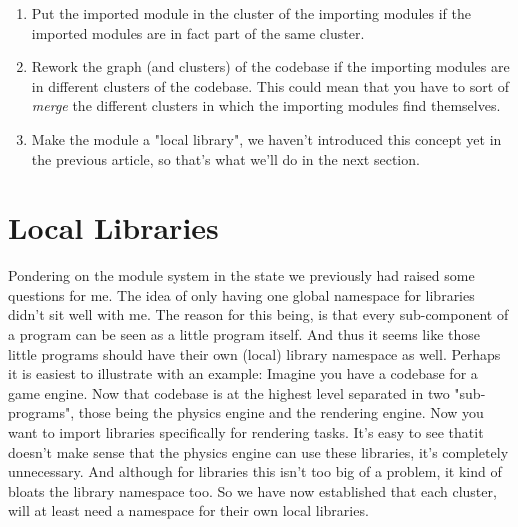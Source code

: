 \documentclass{article}
\begin{document}
 \begin{enumerate}
        \item Put the imported module in the cluster of the importing modules if the imported modules are in fact part of the same cluster.
        

        \item Rework the graph (and clusters) of the codebase if the importing modules are in different clusters of the codebase. 
        This could mean that you have to sort of {\it merge} the different clusters in which the importing modules find themselves.
        
        
        
        \item Make the module a "local library", we haven't introduced this concept yet in the previous article, so that's what we'll do in the next section.
    
    \end{enumerate}

\section{Local Libraries}

Pondering on the module system in the state we previously had raised some questions for me.
The idea of only having one global namespace for libraries didn't sit well with me.
The reason for this being, is that every sub-component of a program can be seen as a little program itself. And thus it seems like those little programs should have their own (local) library namespace as well.
Perhaps it is easiest to illustrate with an example: 
Imagine you have a codebase for a game engine. Now that codebase is at the highest level separated in two "sub-programs", those being the physics engine and the rendering engine.
Now you want to import libraries specifically for rendering tasks.
It's easy to see thatit doesn't make sense that the physics engine can use these libraries, it's completely unnecessary.
And although for libraries this isn't too big of a problem, it kind of bloats the library namespace too.
So we have now established that each cluster, will at least need a namespace for their own local libraries.
\end{document}
